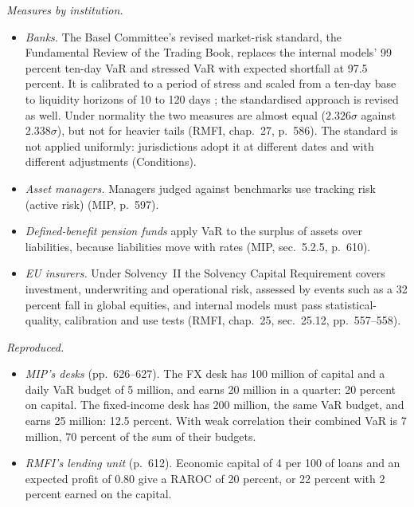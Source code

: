 \begin{qfmethod}
\emph{Measures by institution.}
\begin{itemize}
\item \emph{Banks.} The Basel Committee's revised market-risk standard, the Fundamental Review of the Trading Book, replaces the internal models' 99 percent ten-day VaR and stressed VaR with expected shortfall at 97.5 percent. It is calibrated to a period of stress and scaled from a ten-day base to liquidity horizons of 10 to 120 days \citep[MAR33.3--33.5 and MAR33.12]{basel-framework-ccr-mar-2026}; the standardised approach is revised as well. Under normality the two measures are almost equal ($2.326\sigma$ against $2.338\sigma$), but not for heavier tails (RMFI, chap.~27, p.~586). The standard is not applied uniformly: jurisdictions adopt it at different dates and with different adjustments (Conditions).
\item \emph{Asset managers.} Managers judged against benchmarks use tracking risk (active risk) (MIP, p.~597).
\item \emph{Defined-benefit pension funds} apply VaR to the surplus of assets over liabilities, because liabilities move with rates (MIP, sec.~5.2.5, p.~610).
\item \emph{EU insurers.} Under Solvency~II the Solvency Capital Requirement covers investment, underwriting and operational risk, assessed by events such as a 32 percent fall in global equities, and internal models must pass statistical-quality, calibration and use tests (RMFI, chap.~25, sec.~25.12, pp.~557--558).
\end{itemize}

 \emph{Reproduced.}
\begin{itemize}
\item \emph{MIP's desks} (pp.~626--627). The FX desk has 100 million of capital and a daily VaR budget of 5 million, and earns 20 million in a quarter: 20 percent on capital. The fixed-income desk has 200 million, the same VaR budget, and earns 25 million: 12.5 percent. With weak correlation their combined VaR is 7 million, 70 percent of the sum of their budgets.
\item \emph{RMFI's lending unit} (p.~612). Economic capital of 4 per 100 of loans and an expected profit of 0.80 give a RAROC of 20 percent, or 22 percent with 2 percent earned on the capital.
\end{itemize}


\end{qfmethod}
